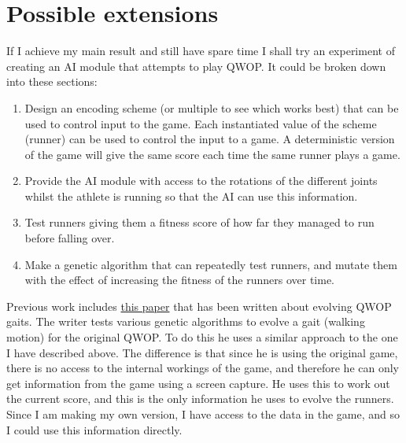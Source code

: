 \documentclass[12pt,a4paper,twoside]{article}
\begin{document}
\section*{Possible extensions}


If I achieve my main result and still have spare time I shall try an experiment of creating an AI module that attempts to play QWOP. It could be broken down into these sections:

\begin{enumerate}
\item Design an encoding scheme (or multiple to see which works best) that can be used to control input to the game. Each instantiated value of the scheme (runner) can be used to control the input to a game. A deterministic version of the game will give the same score each time the same runner plays a game.

\item Provide the AI module with access to the rotations of the different joints whilst the athlete is running so that the AI can use this information.

\item Test runners giving them a fitness score of how far they managed to run before falling over.
  
\item Make a genetic algorithm that can repeatedly test runners, and mutate them with the effect of increasing the fitness of the runners over time.
\end{enumerate}

 

Previous work includes \href{https://dl.acm.org/citation.cfm?id=2598248}{this paper} \cite{ray2014evolving} that has been written about evolving QWOP gaits.
The writer tests various genetic algorithms to evolve a gait (walking motion) for the original QWOP.
To do this he uses a similar approach to the one I have described above. The difference is that since he is using the original game, there is no access to the internal workings of the game, and therefore he can only get information from the game using a screen capture.
He uses this to work out the current score, and this is the only information he uses to evolve the runners. Since I am making my own version, I have access to the data in the game, and so I could use this information directly.
\end{document}
